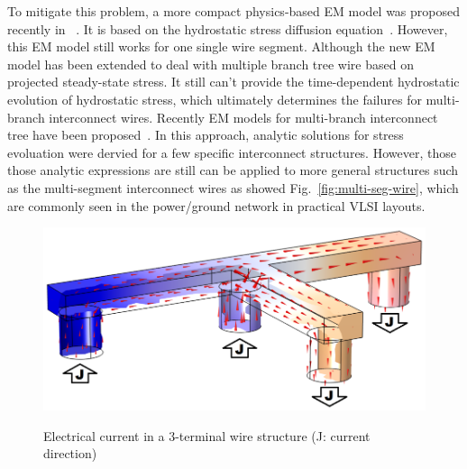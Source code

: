 To mitigate this problem, a more compact physics-based EM model was
proposed recently in ~\cite{HuangYu:DAC'14}. It is based on the
hydrostatic stress diffusion
equation~\cite{Korhonen:jap1993}. However, this EM model still works
for one single wire segment. Although the new EM model has been
extended to deal with multiple branch tree wire based on projected
steady-state stress.  It still can't provide the time-dependent
hydrostatic evolution of hydrostatic stress, which ultimately
determines the failures for multi-branch interconnect wires.  Recently
EM models for multi-branch interconnect tree have been
proposed~\cite{ChenHuang:DAC'15,ChenTan:TCAD'16}. In this approach,
analytic solutions for stress evoluation were dervied for a few
specific interconnect structures. However, those those analytic
expressions are still can be applied to more general structures such
as the multi-segment interconnect wires as showed
Fig.~\ref{fig:multi-seg-wire}, which are commonly seen in the
power/ground network in practical VLSI layouts.

\begin{figure}[!th]
\centering
\includegraphics[width=0.72\columnwidth]{tshape_demo.eps}
\label{fig:tshape-demo}
\caption{Electrical current in a 3-terminal wire structure (J: current direction)}
\end{figure}



